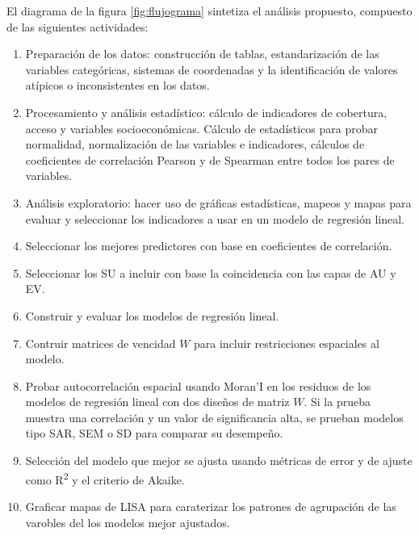 \documentclass[12pt,a4paper,openany]{book}
\providecommand{\tightlist}{%
  \setlength{\itemsep}{0pt}\setlength{\parskip}{0pt}}
\theoremstyle{definition}
\theoremstyle{definition}
\theoremstyle{definition}
\theoremstyle{remark}
\begin{document}
El diagrama de la figura \ref{fig:flujograma} sintetiza el análisis
propuesto, compuesto de las siguientes actividades:

\begin{enumerate}
\def\labelenumi{\arabic{enumi}.}
\tightlist
\item
  Preparación de los datos: construcción de tablas, estandarización de
  las variables categóricas, sistemas de coordenadas y la identificación
  de valores atípicos o inconsistentes en los datos.
\item
  Procesamiento y análisis estadístico: cálculo de indicadores de
  cobertura, acceso y variables socioeconómicas. Cálculo de estadísticos
  para probar normalidad, normalización de las variables e indicadores,
  cálculos de coeficientes de correlación Pearson y de Spearman entre
  todos los pares de variables.
\item
  Análisis exploratorio: hacer uso de gráficas estadísticas, mapeos y
  mapas para evaluar y seleccionar los indicadores a usar en un modelo
  de regresión lineal.
\item
  Seleccionar los mejores predictores con base en coeficientes de
  correlación.
\item
  Seleccionar los SU a incluir con base la coincidencia con las capas de
  AU y EV.
\item
  Construir y evaluar los modelos de regresión lineal.
\item
  Contruir matrices de vencidad \(W\) para incluir restricciones
  espaciales al modelo.
\item
  Probar autocorrelación espacial usando Moran'I en los residuos de los
  modelos de regresión lineal con dos diseños de matriz \(W\). Si la
  prueba muestra una correlación y un valor de significancia alta, se
  prueban modelos tipo SAR, SEM o SD para comparar su desempeño.
\item
  Selección del modelo que mejor se ajusta usando métricas de error y de
  ajuste como R\textsuperscript{2} y el criterio de Akaike.
\item
  Graficar mapas de LISA para caraterizar los patrones de agrupación de
  las varobles del los modelos mejor ajustados.
\end{enumerate}
\end{document}
